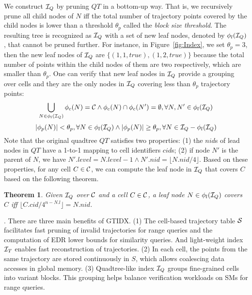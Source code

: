 \documentclass[10pt,conference,letterpaper]{IEEEtran}
\newcommand{\idxname}{GTIDX\xspace }
\newcommand{\allcell}{{\cal C}\xspace}
\newcommand{\trajtable}{{\cal S}\xspace}
\newcommand{\trajindex}{{{\cal I}_T}\xspace}
\newcommand{\treeindex}{{{\cal I}_Q}\xspace}
\newtheorem{theorem}{Theorem}
\begin{document}
We construct $\treeindex$ by pruning $QT$ in a bottom-up way. That is, we recursively prune all child nodes of $N$ iff the total number of trajectory points covered by the child nodes is lower than a threshold $\theta_p$ called the \emph{block size threshold}. The resulting tree is recognized as $\treeindex$ with a set of new leaf nodes, denoted by $\phi_l(\treeindex)$, that cannot be pruned further. For instance, in Figure~\ref{fig:Index}, we set $\theta_p=3$, then the new leaf nodes of $\treeindex$ are $\{(1,1,true),(1,2,true)\}$ because the total number of points within the child nodes of them are two respectively, which are smaller than $\theta_p$. One can verify that new leaf nodes in $\treeindex$ provide a grouping over cells and they are the only nodes in $\treeindex$ covering less than $\theta_p$ trajectory points:
\begin{equation}\label{eq:cond1}
\small
\bigcup_{N\in\phi_l(\treeindex)} {\phi_c(N)}= \allcell  \wedge \phi_c(N)\cap \phi_c(N') = \emptyset, \forall N, N'\in\phi_l(\treeindex)
\end{equation}
\begin{equation}\label{eq:cond2}
\small
|\phi_p(N)| < \theta_p, \forall N\in\phi_l(\treeindex) \wedge
|\phi_p(N)| \geq \theta_p, \forall N\in \treeindex-\phi_l(\treeindex)
\end{equation}
%
Note that the original quadtree $QT$ satisfies two properties: (1) the $nid$s of lead nodes in $QT$ have a 1-to-1 mapping to cell identifiers $cid$s; (2) if node $N'$ is the parent of $N$, we have $N'.level = N.level-1 \wedge N'.nid =  \lfloor N.nid/4 \rfloor$.
Based on these properties, for any cell $C\in\allcell$, we can compute the leaf node in $\treeindex$ that covers $C$ based on the following theorem.
%
\begin{theorem}\label{le:findleaf}
	Given $\treeindex$ over $\allcell$ and a cell $C\in\allcell$, a leaf node $N\in \phi_l(\treeindex)$ covers $C$ iff $\lfloor C.cid/4^{n-N.l}\rfloor = N.nid$.	
\end{theorem}




\vspace{0.1cm}{\bf Benefits of \idxname}.
There are three main benefits of \idxname.
%
(1) The cell-based trajectory table $\trajtable$ facilitates fast pruning of invalid trajectories for range queries and the computation of EDR lower bounds for similarity queries. And light-weight index $\trajindex$ enables fast reconstruction of trajectories.
(2) In each cell, the points from the same trajectory are stored continuously in $S$, which allows coalescing data accesses in global memory.
(3) Quadtree-like index $\treeindex$ groups fine-grained cells into variant blocks. This grouping helps balance verification workloads on SMs for range queries.
\end{document}

